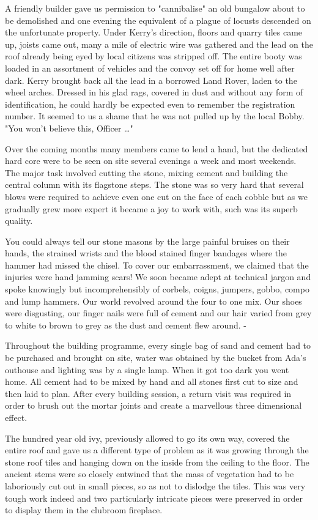 \documentclass[a5paper,openany,font 10pt]{scrbook}
\begin{document}
A friendly builder gave us permission to "cannibalise" an
old bungalow about to be demolished and one evening the
equivalent of a plague of locusts descended on the unfortunate
property. Under Kerry's direction, floors and quarry tiles came
up, joists came out, many a mile of electric wire was gathered
and the lead on the roof  already being eyed by local citizens
was stripped off. The entire booty was loaded in an assortment of
vehicles and the convoy set off for home well after dark. Kerry
brought back all the lead in a borrowed Land Rover, laden to the
wheel arches. Dressed in his glad rags, covered in dust and
without any form of identification, he could hardly be expected
even to remember the registration number. It seemed to us a shame
that he was not pulled up by the local Bobby. "You won't believe
this, Officer \ldots{}"

Over the coming months many members came to lend a hand, but
the dedicated hard core were to be seen on site several evenings
a week and most weekends. The major task involved cutting the
stone, mixing cement and building the central column with its
flagstone steps. The stone was so very hard that several blows
were required to achieve even one cut on the face of each cobble
but as we gradually grew more expert it became a joy to work
with, such was its superb quality.

You could always tell our stone masons by the large painful
bruises on their hands, the strained wrists and the blood stained
finger bandages where the hammer had missed the chisel. To cover
our embarrassment, we claimed that the injuries were hand jamming
scars! We soon became adept at technical jargon and spoke
knowingly but incomprehensibly of corbels, coigns, jumpers,
gobbo, compo and lump hammers. Our world revolved around the
four to one mix. Our shoes were disgusting, our finger nails were
full of cement and our hair varied from grey to white to brown to
grey as the dust and cement flew around. -

Throughout the building programme, every single bag of sand
and cement had to be purchased and  brought on site, water was
obtained by the bucket from Ada's outhouse and lighting was by a
single lamp. When it got too dark you went home. All cement had
to be mixed by hand and all stones first cut to size and then
laid to plan. After every building session, a return visit was
required in order to brush out the mortar joints and create a
marvellous three dimensional effect.

The hundred year old ivy, previously allowed to go its own
way, covered the entire roof and gave us a different type of
problem as it was growing through the stone roof tiles and
hanging down on the inside from the ceiling to the floor. The
ancient stems were so closely entwined that the mass of
vegetation had to be laboriously cut out in small pieces, so as
not to dislodge the tiles. This was very tough work indeed and
two particularly intricate pieces were preserved in order to
display them in the clubroom fireplace.
\end{document}
